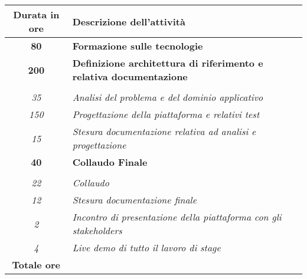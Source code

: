 

\begin{tabularx}{\textwidth}{|c|X|}
	\hline
	\textbf{Durata in ore} & \textbf{Descrizione dell'attività} \\\hline
	
	\textbf{80} & \textbf{Formazione sulle tecnologie} \\	 
    \hline
    
    \textbf{200} & \textbf{Definizione architettura di riferimento e relativa documentazione} \\ \hdashline 
    \multirow{3}{0cm}\\ 
    \textit{35} & 
    \textit{Analisi del problema e del dominio applicativo} \\
    \textit{150} & 
    \textit{Progettazione della piattaforma e relativi test} \\
    \textit{15} & 
    \textit{Stesura documentazione relativa ad analisi e progettazione} \\
    \hline
    
    \textbf{40} & \textbf{Collaudo Finale}  \\ \hdashline 
    \multirow{4}{0cm}\\ 
    \textit{22} & 
    \textit{Collaudo} \\
    \textit{12} & 
    \textit{Stesura documentazione finale} \\
    \textit{2} & 
    \textit{Incontro di presentazione della piattaforma con gli stakeholders} \\
    \textit{4} & 
    \textit{Live demo di tutto il lavoro di stage} \\
    \hline
	
	\textbf{Totale ore} & \multicolumn{1}{|c|}{\textbf{\totaleOre}} \\\hline
	
	
\end{tabularx}